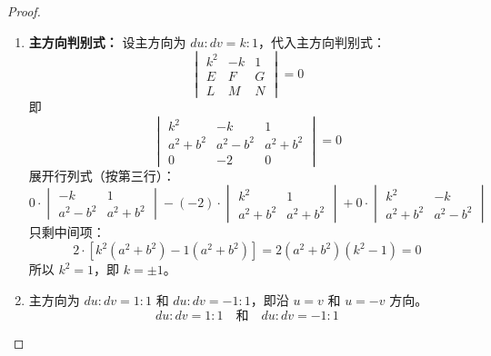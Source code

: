 \documentclass[lang=cn,10pt,thmcnt=section]{elegantbook}
\begin{document}
\begin{proof}
\begin{enumerate}
        \item \textbf{主方向判别式：}
        设主方向为 $du:dv = k:1$，代入主方向判别式：
        \[
        \begin{vmatrix}
        k^2 & -k & 1 \\
        E & F & G \\
        L & M & N
        \end{vmatrix}
        = 0
        \]
        即
        \[
        \begin{vmatrix}
        k^2 & -k & 1 \\
        a^2+b^2 & a^2-b^2 & a^2+b^2 \\
        0 & -2 & 0
        \end{vmatrix}
        = 0
        \]
        展开行列式（按第三行）：
        \[
        0 \cdot \begin{vmatrix} -k & 1 \\ a^2-b^2 & a^2+b^2 \end{vmatrix}
        - (-2) \cdot \begin{vmatrix} k^2 & 1 \\ a^2+b^2 & a^2+b^2 \end{vmatrix}
        + 0 \cdot \begin{vmatrix} k^2 & -k \\ a^2+b^2 & a^2-b^2 \end{vmatrix}
        \]
        只剩中间项：
        \[
        2 \cdot \left[ k^2(a^2+b^2) - 1(a^2+b^2) \right] = 2(a^2+b^2)(k^2 - 1) = 0
        \]
        所以 $k^2 = 1$，即 $k = \pm 1$。
        
        \item 
        主方向为 $du:dv = 1:1$ 和 $du:dv = -1:1$，即沿 $u = v$ 和 $u = -v$ 方向。
        \[
        \boxed{du:dv = 1:1 \quad \text{和} \quad du:dv = -1:1}
        \]
    \end{enumerate}
\end{proof}
\end{document}
